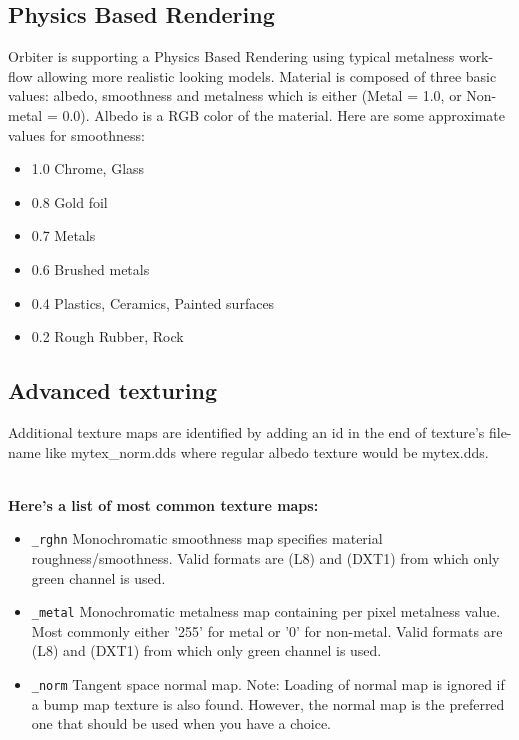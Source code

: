 \documentclass[Orbiter Developer Manual.tex]{subfiles}
\begin{document}
\subsection{Physics Based Rendering}
Orbiter is supporting a Physics Based Rendering using typical metalness work-flow allowing more realistic looking models. Material is composed of three basic values: albedo, smoothness and metalness which is either (Metal = 1.0, or Non-metal = 0.0). Albedo is a RGB color of the material. Here are some approximate values for smoothness:

\begin{itemize}
\item	1.0 Chrome, Glass
\item	0.8 Gold foil
\item	0.7 Metals
\item 0.6 Brushed metals
\item	0.4 Plastics, Ceramics, Painted surfaces
\item	0.2 Rough Rubber, Rock
\end{itemize}
\break
\subsection{Advanced texturing}
Additional texture maps are identified by adding an id in the end of texture's file-name like mytex\_norm.dds where regular albedo texture would be mytex.dds.\\\ 

\textbf{Here's a list of most common texture maps:}
\begin{itemize}
\item	\texttt{\_rghn} Monochromatic smoothness map specifies material roughness/smoothness. Valid formats are (L8) and (DXT1) from which only green channel is used.
\item	\texttt{\_metal} Monochromatic metalness map containing per pixel metalness value. Most commonly either '255' for metal or '0' for non-metal. Valid formats are (L8) and (DXT1) from which only green channel is used.
\item	\texttt{\_norm} Tangent space normal map. Note: Loading of normal map is ignored if a bump map texture is also found. However, the normal map is the preferred one that should be used when you have a choice. 
\end{itemize}
\end{document}
